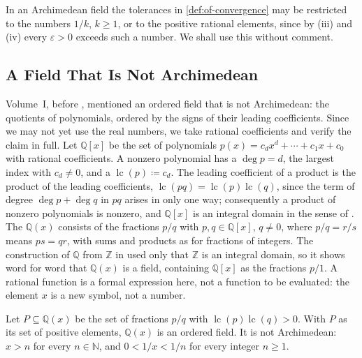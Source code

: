 In an Archimedean field the tolerances in \cref{def:of-convergence} may be restricted to the numbers $1/k$, $k\ge1$, or to the positive rational elements, since by (iii) and (iv) every $\varepsilon>0$ exceeds such a number. We shall use this without comment.

\subsection{A Field That Is Not Archimedean}

Volume~I, before , mentioned an ordered field that is not Archimedean: the quotients of polynomials, ordered by the signs of their leading coefficients. Since we may not yet use the real numbers, we take rational coefficients and verify the claim in full. Let $\mathbb Q[x]$ be the set of polynomials $p(x)=c_dx^d+\cdots+c_1x+c_0$ with rational coefficients. A nonzero polynomial has a  $\deg p=d$, the largest index with $c_d\ne0$, and a  $\operatorname{lc}(p)\coloneqq c_d$. The leading coefficient of a product is the product of the leading coefficients, $\operatorname{lc}(pq)=\operatorname{lc}(p)\operatorname{lc}(q)$, since the term of degree $\deg p+\deg q$ in $pq$ arises in only one way; consequently a product of nonzero polynomials is nonzero, and $\mathbb Q[x]$ is an integral domain in the sense of . The  $\mathbb Q(x)$ consists of the fractions $p/q$ with $p,q\in\mathbb Q[x]$, $q\ne0$, where $p/q=r/s$ means $ps=qr$, with sums and products as for fractions of integers. The construction of $\mathbb Q$ from $\mathbb Z$ in  used only that $\mathbb Z$ is an integral domain, so it shows word for word that $\mathbb Q(x)$ is a field, containing $\mathbb Q[x]$ as the fractions $p/1$. A rational function is a formal expression here, not a function to be evaluated: the element $x$ is a new symbol, not a number.

\begin{proposition}
\label{prop:rational-functions}
Let $P\subseteq\mathbb Q(x)$ be the set of fractions $p/q$ with $\operatorname{lc}(p)\operatorname{lc}(q)>0$. With $P$ as its set of positive elements, $\mathbb Q(x)$ is an ordered field. It is not Archimedean: $x>n$ for every $n\in\mathbb N$, and $0<1/x<1/n$ for every integer $n\ge1$.
\end{proposition}

